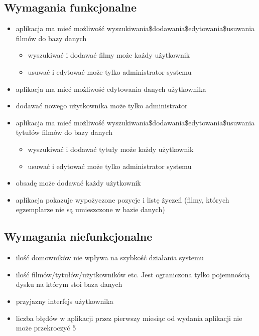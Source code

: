 \documentclass{article}
\begin{document}
	\subsection{Wymagania funkcjonalne}
	\begin{itemize}
	\item aplikacja ma mieć możliwość wyszukiwania\$dodawania\$edytowania\$usuwania filmów do bazy danych
	\begin{itemize}
		\item wyszukiwać i dodawać filmy może każdy użytkownik
		\item usuwać i edytować może tylko administrator systemu
	\end{itemize}
	\item aplikacja ma mieć możliwość edytowania danych użytkownika
	\item  dodawać nowego użytkownika może tylko administrator
	\item aplikacja ma mieć możliwość wyszukiwania\$dodawania\$edytowania\$usuwania tytułów filmów do bazy danych 
	\begin{itemize}
		\item wyszukiwać i dodawać tytuły może każdy użytkownik
		\item usuwać i edytować może tylko administrator systemu
	\end{itemize}
	\item obsadę może dodawać każdy użytkownik
	\item aplikacja pokazuje wypożyczone pozycje i listę życzeń (filmy, których egzemplarze nie są umieszczone w bazie danych)
	\end{itemize}
	\subsection{Wymagania niefunkcjonalne}	
	\begin{itemize}
		\item ilość domowników nie wpływa na szybkość działania systemu
		\item ilość filmów/tytułów/użytkowników etc. Jest ograniczona tylko pojemnością dysku na którym stoi baza danych
		\item przyjazny interfejs użytkownika
		\item liczba błędów w aplikacji przez pierwszy miesiąc od wydania aplikacji nie może przekroczyć 5		
	\end{itemize}
\newpage
\end{document}

